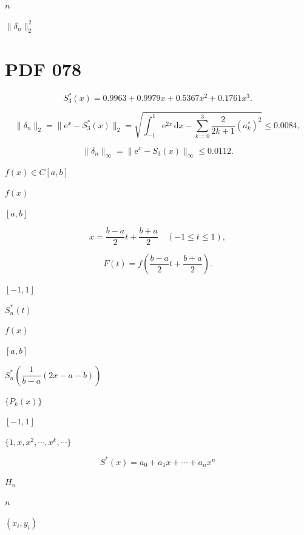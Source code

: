 \documentclass[UTF8,fontset=fandol,a4paper]{ctexart}
\begin{document}
\noindent $n$\par

\noindent $\|\delta_n\|_2^2$\par

\section*{PDF 078}

\[
S_3^*(x)=0.9963+0.9979x+0.5367x^2+0.1761x^3.
\]

\[
\|\delta_n\|_2=\|\mathrm e^x-S_3^*(x)\|_2=\sqrt{\int_{-1}^1\mathrm e^{2x}\,\mathrm dx-\sum_{k=0}^3\frac{2}{2k+1}(a_k^*)^2}\leqslant0.0084,
\]

\[
\|\delta_n\|_\infty=\|\mathrm e^x-S_3(x)\|_\infty\leqslant0.0112.
\]

\noindent $f(x)\in C[a,b]$\par

\noindent $f(x)$\par

\noindent $[a,b]$\par

\[
x=\frac{b-a}{2}t+\frac{b+a}{2}\quad(-1\leqslant t\leqslant1),
\]

\[
F(t)=f\left(\frac{b-a}{2}t+\frac{b+a}{2}\right).
\]

\noindent $[-1,1]$\par

\noindent $S_n^*(t)$\par

\noindent $f(x)$\par

\noindent $[a,b]$\par

\noindent $S_n^*\left(\dfrac1{b-a}(2x-a-b)\right)$\par

\noindent $\{P_k(x)\}$\par

\noindent $[-1,1]$\par

\noindent $\{1,x,x^2,\cdots,x^k,\cdots\}$\par

\[
S^*(x)=a_0+a_1x+\cdots+a_nx^n
\]

\noindent $H_n$\par

\noindent $n$\par

\noindent $(x_i,y_i)$\par
\end{document}
